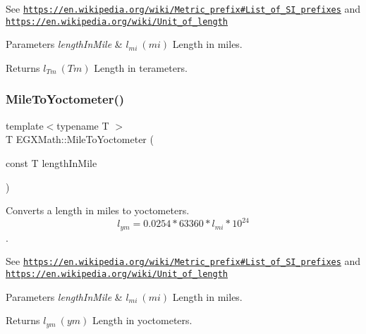 See \href{https://en.wikipedia.org/wiki/Metric_prefix#List_of_SI_prefixes}{\tt https\+://en.\+wikipedia.\+org/wiki/\+Metric\+\_\+prefix\#\+List\+\_\+of\+\_\+\+S\+I\+\_\+prefixes} and \href{https://en.wikipedia.org/wiki/Unit_of_length}{\tt https\+://en.\+wikipedia.\+org/wiki/\+Unit\+\_\+of\+\_\+length} 
\begin{DoxyParams}{Parameters}
{\em length\+In\+Mile} & $ l_{mi}\ (mi)$ Length in miles. \\
\hline
\end{DoxyParams}
\begin{DoxyReturn}{Returns}
$ l_{Tm}\ (Tm)$ Length in terameters. 
\end{DoxyReturn}
\mbox{\label{group___e_g_x_math-_conversions-_length_conversions-_imperial-_mile-_s_i_ga828eb49720729eca76e81999b0565959}} 
\subsubsection{\texorpdfstring{Mile\+To\+Yoctometer()}{MileToYoctometer()}}
{\footnotesize\ttfamily template$<$typename T $>$ \\
T E\+G\+X\+Math\+::\+Mile\+To\+Yoctometer (\begin{DoxyParamCaption}\item[{const T}]{length\+In\+Mile }\end{DoxyParamCaption})}



Converts a length in miles to yoctometers. \[ l_{ym}=0.0254 * 63360 * l_{mi} * 10^{24} \]. 

See \href{https://en.wikipedia.org/wiki/Metric_prefix#List_of_SI_prefixes}{\tt https\+://en.\+wikipedia.\+org/wiki/\+Metric\+\_\+prefix\#\+List\+\_\+of\+\_\+\+S\+I\+\_\+prefixes} and \href{https://en.wikipedia.org/wiki/Unit_of_length}{\tt https\+://en.\+wikipedia.\+org/wiki/\+Unit\+\_\+of\+\_\+length} 
\begin{DoxyParams}{Parameters}
{\em length\+In\+Mile} & $ l_{mi}\ (mi)$ Length in miles. \\
\hline
\end{DoxyParams}
\begin{DoxyReturn}{Returns}
$ l_{ym}\ (ym)$ Length in yoctometers. 
\end{DoxyReturn}
\mbox{\label{group___e_g_x_math-_conversions-_length_conversions-_imperial-_mile-_s_i_ga26416c1c62f8b0c2cb290f4c984e8a42}} 
